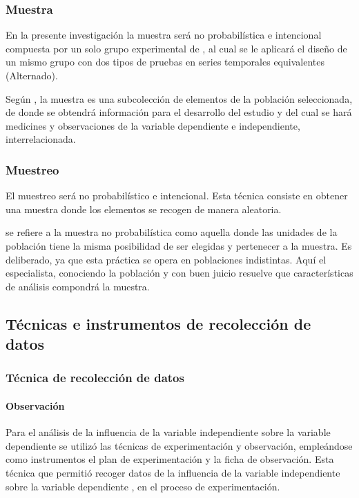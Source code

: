 \documentclass[12pt,a4paper]{article}
\begin{document}
\subsubsection{Muestra}

En la presente investigación la muestra será no probabilística e intencional compuesta por un solo grupo experimental de \muestra, al cual se le aplicará el diseño \MakeTextLowercase{\diseno} de un mismo grupo con dos tipos de pruebas en series temporales equivalentes (Alternado).

Según \cite{hernandez_sampieri_metodologiinvestigacion_2014}, la muestra es una subcolección de elementos de la población seleccionada, de donde se obtendrá información para el desarrollo del estudio y del cual se hará medicines y observaciones de la variable dependiente e independiente, interrelacionada.

\subsubsection{Muestreo}

El muestreo será no probabilístico e intencional. Esta técnica consiste  en obtener una muestra donde los elementos  se recogen de manera aleatoria.

\cite{alzina_metodologiinvestigacion_2004} se refiere a la muestra no probabilística como aquella donde las unidades de la población tiene la misma posibilidad de ser elegidas y pertenecer a la muestra. Es deliberado, ya que esta práctica se opera en poblaciones indistintas. Aquí el especialista, conociendo la población y con buen juicio resuelve que características de análisis compondrá la muestra.


\subsection{Técnicas e instrumentos de recolección de datos}

\subsubsection{Técnica de recolección de datos}

\paragraph{Observación} Para el análisis de la influencia de la variable independiente sobre la variable dependiente se utilizó las técnicas de experimentación y observación, empleándose como instrumentos el plan de experimentación y la ficha de observación. Esta técnica que permitió recoger datos de la influencia de la variable independiente \MakeTextLowercase{\variablei} sobre la variable dependiente \MakeTextLowercase{\variabled}, en el proceso de experimentación.
\end{document}
